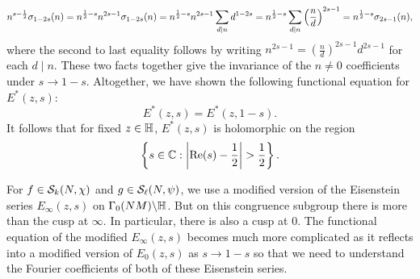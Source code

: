       \[
        n^{s-\frac{1}{2}}\sigma_{1-2s}(n) = n^{\frac{1}{2}-s}n^{2s-1}\sigma_{1-2s}(n) = n^{\frac{1}{2}-s}n^{2s-1}\sum_{d \mid n}d^{1-2s} = n^{\frac{1}{2}-s}\sum_{d \mid n}\left(\frac{n}{d}\right)^{2s-1} = n^{\frac{1}{2}-s}\sigma_{2s-1}(n),
      \]
      where the second to last equality follows by writing $n^{2s-1} = \left(\frac{n}{d}\right)^{2s-1}d^{2s-1}$ for each $d \mid n$. These two facts together give the invariance of the $n \neq 0$ coefficients under $s \to 1-s$. Altogether, we have shown the following functional equation for $E^{\ast}(z,s)$:
      \[
        E^{\ast}(z,s) = E^{\ast}(z,1-s).
      \]
      It follows that for fixed $z \in \mathbb{H}$, $E^{\ast}(z,s)$ is holomorphic on the region
      \[
        \left\{s \in \mathbb{C}:\left|\mathrm{Re}(s)-\frac{1}{2}\right| > \frac{1}{2}\right\}.
      \]

      \begin{remark}
        For $f \in \mathcal{S}_{k}(N,\chi)$ and $g \in \mathcal{S}_{\ell}(N,\psi)$, we use a modified version of the Eisenstein series $E_{\infty}(z,s)$ on $\Gamma_{0}(NM)\backslash\mathbb{H}$. But on this congruence subgroup there is more than the cusp at $\infty$. In particular, there is also a cusp at $0$. The functional equation of the modified $E_{\infty}(z,s)$ becomes much more complicated as it reflects into a modified version of $E_{0}(z,s)$ as $s \to 1-s$ so that we need to understand the Fourier coefficients of both of these Eisenstein series.
      \end{remark}

